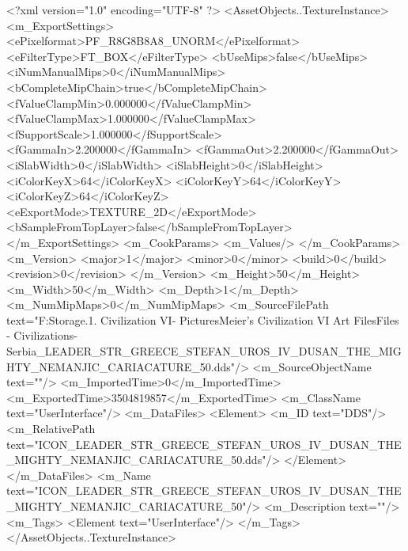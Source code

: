 <?xml version="1.0" encoding="UTF-8" ?>
<AssetObjects..TextureInstance>
	<m_ExportSettings>
		<ePixelformat>PF_R8G8B8A8_UNORM</ePixelformat>
		<eFilterType>FT_BOX</eFilterType>
		<bUseMips>false</bUseMips>
		<iNumManualMips>0</iNumManualMips>
		<bCompleteMipChain>true</bCompleteMipChain>
		<fValueClampMin>0.000000</fValueClampMin>
		<fValueClampMax>1.000000</fValueClampMax>
		<fSupportScale>1.000000</fSupportScale>
		<fGammaIn>2.200000</fGammaIn>
		<fGammaOut>2.200000</fGammaOut>
		<iSlabWidth>0</iSlabWidth>
		<iSlabHeight>0</iSlabHeight>
		<iColorKeyX>64</iColorKeyX>
		<iColorKeyY>64</iColorKeyY>
		<iColorKeyZ>64</iColorKeyZ>
		<eExportMode>TEXTURE_2D</eExportMode>
		<bSampleFromTopLayer>false</bSampleFromTopLayer>
	</m_ExportSettings>
	<m_CookParams>
		<m_Values/>
	</m_CookParams>
	<m_Version>
		<major>1</major>
		<minor>0</minor>
		<build>0</build>
		<revision>0</revision>
	</m_Version>
	<m_Height>50</m_Height>
	<m_Width>50</m_Width>
	<m_Depth>1</m_Depth>
	<m_NumMipMaps>0</m_NumMipMaps>
	<m_SourceFilePath text="F:\Mod Storage\2.1. Civilization VI\Mods\Archive - Pictures\Sid Meier's Civilization VI Art Files\Art Files - Civilizations\Civilization - Serbia\ICON_LEADER_STR_GREECE_STEFAN_UROS_IV_DUSAN_THE_MIGHTY_NEMANJIC_CARIACATURE_50.dds"/>
	<m_SourceObjectName text=""/>
	<m_ImportedTime>0</m_ImportedTime>
	<m_ExportedTime>3504819857</m_ExportedTime>
	<m_ClassName text="UserInterface"/>
	<m_DataFiles>
		<Element>
			<m_ID text="DDS"/>
			<m_RelativePath text="ICON_LEADER_STR_GREECE_STEFAN_UROS_IV_DUSAN_THE_MIGHTY_NEMANJIC_CARIACATURE_50.dds"/>
		</Element>
	</m_DataFiles>
	<m_Name text="ICON_LEADER_STR_GREECE_STEFAN_UROS_IV_DUSAN_THE_MIGHTY_NEMANJIC_CARIACATURE_50"/>
	<m_Description text=""/>
	<m_Tags>
		<Element text="UserInterface"/>
	</m_Tags>
</AssetObjects..TextureInstance>

